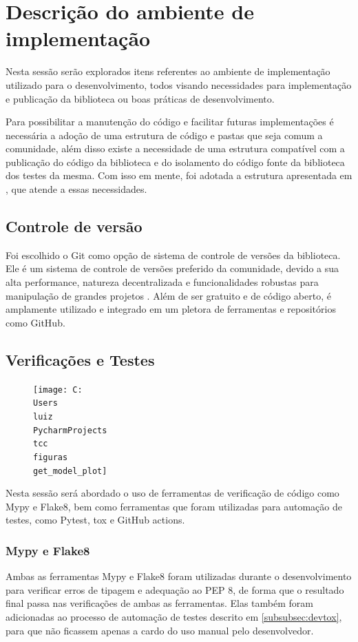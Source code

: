 \section{Descrição do ambiente de implementação}

Nesta sessão serão explorados itens referentes ao ambiente de implementação utilizado para o
desenvolvimento, todos visando necessidades para implementação e publicação da biblioteca ou boas práticas de
desenvolvimento.

Para possibilitar a manutenção do código e facilitar futuras implementações é necessária a adoção de uma
estrutura de código e pastas que seja comum a comunidade, além disso existe a necessidade de uma estrutura compatível
com a publicação do código da biblioteca e do isolamento do código fonte da biblioteca dos testes da mesma.
Com isso em mente, foi adotada a estrutura apresentada em \cite{auto_test_vid}, que atende a essas necessidades.

\subsection{Controle de versão}

Foi escolhido o Git como opção de sistema de controle de versões da biblioteca.
Ele é um sistema de controle de versões preferido da comunidade, devido a sua alta performance, natureza decentralizada
e funcionalidades robustas para manipulação de grandes projetos \cite{usegit}.
Além de ser gratuito e de código aberto, é amplamente utilizado e integrado em um pletora de ferramentas e repositórios
como GitHub.

\subsection{Verificações e Testes}
\begin{figure}
    \centering
    \texttt{[image: C:\\Users\\luiz\\PycharmProjects\\tcc\\figuras\\get\_model\_plot]}
    \caption{}
    \label{fig:}
\end{figure}
Nesta sessão será abordado o uso de ferramentas de verificação de código como Mypy e Flake8, bem como ferramentas
que foram utilizadas para automação de testes, como Pytest, tox e GitHub actions.

\subsubsection{Mypy e Flake8}
Ambas as ferramentas Mypy e Flake8 foram utilizadas durante o desenvolvimento para verificar erros de tipagem e
adequação ao PEP 8, de forma que o resultado final passa nas verificações de ambas as ferramentas.
Elas também foram adicionadas ao processo de automação de testes descrito em \ref{subsubsec:devtox}, para que não
ficassem apenas a cardo do uso manual pelo desenvolvedor.

